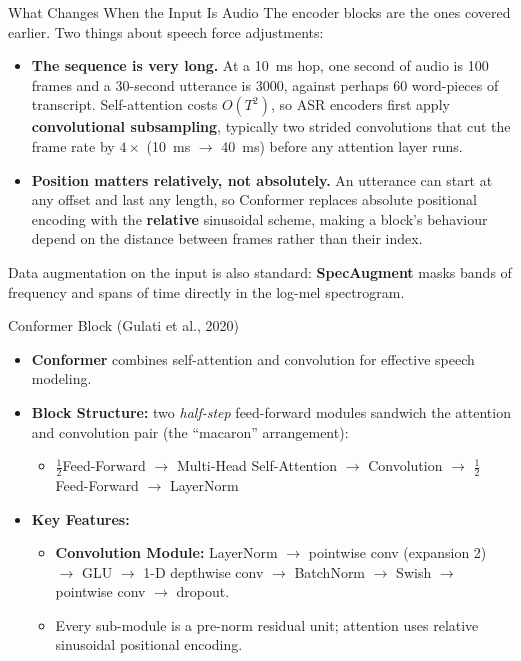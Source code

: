 \begin{frame}{What Changes When the Input Is Audio}
    The encoder blocks are the ones covered earlier. Two things about speech force adjustments:
    \begin{itemize}
        \setlength{\itemsep}{0.8em}
        \item \textbf{The sequence is very long.} At a 10~ms hop, one second of audio is 100 frames and a 30-second utterance is 3000, against perhaps 60 word-pieces of transcript. Self-attention costs $O(T^2)$, so ASR encoders first apply \textbf{convolutional subsampling}, typically two strided convolutions that cut the frame rate by $4\times$ (10~ms $\rightarrow$ 40~ms) before any attention layer runs.
        \item \textbf{Position matters relatively, not absolutely.} An utterance can start at any offset and last any length, so Conformer replaces absolute positional encoding with the \textbf{relative} sinusoidal scheme, making a block's behaviour depend on the distance between frames rather than their index.
    \end{itemize}
    \vspace{0.4em}
    Data augmentation on the input is also standard: \textbf{SpecAugment} masks bands of frequency and spans of time directly in the log-mel spectrogram.
\end{frame}

\begin{frame}{Conformer Block (Gulati et al., 2020)}
    \begin{itemize}
        \item \textbf{Conformer} combines self-attention and convolution for effective speech modeling.
        \item \textbf{Block Structure:} two \emph{half-step} feed-forward modules sandwich the attention and convolution pair (the ``macaron'' arrangement):
        \begin{itemize}
            \item $\tfrac{1}{2}$Feed-Forward $\rightarrow$ Multi-Head Self-Attention $\rightarrow$ Convolution $\rightarrow$ $\tfrac{1}{2}$Feed-Forward $\rightarrow$ LayerNorm
        \end{itemize}
        \item \textbf{Key Features:}
        \begin{itemize}
            \item \textbf{Convolution Module:} LayerNorm $\rightarrow$ pointwise conv (expansion 2) $\rightarrow$ GLU $\rightarrow$ 1-D depthwise conv $\rightarrow$ BatchNorm $\rightarrow$ Swish $\rightarrow$ pointwise conv $\rightarrow$ dropout.
            \item Every sub-module is a pre-norm residual unit; attention uses relative sinusoidal positional encoding.
        \end{itemize}
    \end{itemize}
\end{frame}
